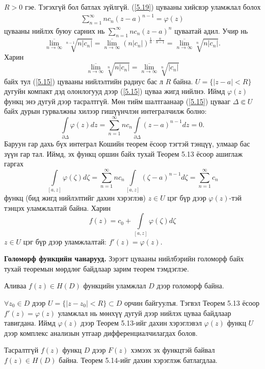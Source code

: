 \begin{prf}
$R>0$ гэе. Тэгэхгүй бол батлах зүйлгүй. (\ref{5.19}) цувааны хийсвэр уламжлал болох
\begin{eqnarray} \label{5.15}
    \sum\limits_{n=1}^\infty nc_n (z-a)^{n-1}=\varphi (z)
\end{eqnarray}
цувааны нийлэх буюу сарних нь $\sum\limits_{n=1}^\infty nc_n(z-a)^n$ цуваатай  адил. Учир нь
$$\overline{\lim\limits_{n\rightarrow \infty}} \sqrt[n-1]{n|c_n|} = \overline{\lim\limits_{n\rightarrow \infty}} (n|c_n|)^{\frac{1}{n}\cdot \frac{n}{n-1}} =\overline{\lim\limits_{n\rightarrow \infty}} \sqrt[n]{n|c_n|}.$$
Харин 
$$\overline{\lim\limits_{n\rightarrow \infty}} \sqrt[n]{n|c_n|} =\overline{\lim\limits_{n\rightarrow \infty}} \sqrt[n]{|c_n|}$$ байх тул (\ref{5.15}) цувааны нийлэлтийн радиус бас л $R$ байна. $U=\{|z-a|<R\}$ дугуйн компакт дэд олонлогууд дээр (\ref{5.15}) цуваа жигд нийлнэ. Иймд $\varphi (z)$ функц энэ дугуй дээр тасралтгүй. Мөн тийм шалтгаанаар (\ref{5.15}) цувааг $\Delta \Subset U$ байх дурын гурвалжны хилээр гишүүнчлэн интегралчилж болно:
$$\int\limits_{\partial \Delta} \varphi(z)dz=\sum\limits_{n=1}^\infty nc_n\int\limits_{\partial \Delta}(z-a)^{n-1}dz=0.$$
Баруун гар дахь бүх интеграл Кошийн теорем ёсоор тэгтэй тэнцүү, улмаар бас зүүн гар тал. Иймд, эх функц оршин байх тухай Теорем 5.13 ёсоор ашиглаж гаргах
$$\int\limits_{[a,z]} \varphi (\zeta)d\zeta=\sum\limits_{n=1}^\infty nc_n\int\limits_{[a,z]}(\zeta-a)^{n-1}d\zeta=\sum\limits_{n=1}^\infty c_n$$
функц (бид жигд нийлэлтийг дахин хэрэглэв) $z\in U$ цэг бүр дээр $\varphi(z)$-тэй тэнцэх уламжлалтай байна. Харин
$$f(z)=c_0+\int\limits_{[a,z]}\varphi (\zeta)d\zeta$$ 
$z\in U$ цэг бүр дээр уламжлалтай: $f'(z)=\varphi (z).$ 
 \end{prf}
\textbf{Голоморф функцийн чанарууд.} Зэрэгт цувааны нийлбэрийн голоморф байх тухай теоремын мөрдлөг байдлаар зарим теорем тэмдэглэе.
\begin{thm}
Аливаа $f(z)\in H(D)$ функцийн уламжлал $D$ дээр голоморф байна.
\end{thm}
\begin{prf}
$\forall z_0\in D$ дээр $U=\{|z-z_0|<R\}\subset D$ орчин байгуулъя. Тэгвэл Теорем 5.13 ёсоор $f'(z)=\varphi (z)$ уламжлал нь мөнхүү дугуй дээр нийлэх цуваа байдлаар тавигдана. Иймд $\varphi(z)$ дээр Теорем 5.13-ийг дахин хэрэглэвэл $\varphi(z)$ функц $U$ дээр комплекс анализын утгаар дифференциалчилагдах болов.
 \end{prf}
\begin{cor}
Тасралтгүй $f(z)$ функц $D$ дээр $F(z)$ хэмээх эх функцтэй байвал $f(z)\in H(D)$ байна. Теорем 5.14-ийг дахин хэрэглэж батлагдлаа.
\end{cor}
